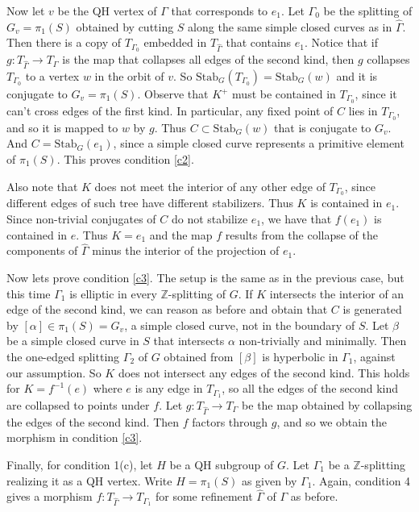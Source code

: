 \documentclass[12pt]{amsart}
\newcommand{\Z}{\mathbb{Z}}
\newcommand{\Stab}{\mbox{Stab}}
\begin{document}
 Now let $v$ be the QH vertex of $\Gamma$ that corresponds to $e_1$. Let $\Gamma_0$ be the splitting of $G_v = \pi_1(S)$ obtained by cutting $S$ along the same simple closed curves as in $\hat \Gamma$. Then there is a copy of $T_{\Gamma_0}$ embedded in $T_{\hat \Gamma}$ that contains $e_1$. Notice that if $g:T_{\hat \Gamma} \to T_{\Gamma}$ is the map that collapses all edges of the second kind, then $g$ collapses $T_{\Gamma_0}$ to a vertex $w$ in the orbit of $v$. So $\Stab_G(T_{\Gamma_0})=\Stab_G(w)$ and it is conjugate to $G_v = \pi_1(S)$. Observe that  $K^+$ must be contained in $T_{\Gamma_0}$, since it can't cross edges of the first kind. In particular, any fixed point of $C$ lies in $T_{\Gamma_0}$, and so it is mapped to $w$ by $g$. Thus $C\subset \Stab_G(w)$ that is conjugate to $ G_v$. And $C=\Stab_G(e_1)$, since a simple closed curve represents a primitive element of $\pi_1(S)$. This proves condition \ref{c2}.

Also note that $K$ does not meet the interior of any other edge of $T_{\Gamma_0}$, since different edges of such tree have different stabilizers. Thus $K$ is contained in $e_1$. Since non-trivial conjugates of $C$ do not stabilize $e_1$, we have that $f(e_1)$ is contained in $e$. Thus $K=e_1$ and the map $f$ results from the collapse of the components of $\hat \Gamma$ minus the interior of the projection of $e_1$. 

Now lets prove condition \ref{c3}. The setup is the same as in the previous case, but this time $\Gamma_1$ is elliptic in every $\Z$-splitting of $G$. If $K$ intersects the interior of an edge of the second kind, we can reason as before and obtain that $C$ is generated by $[\alpha] \in \pi_1(S) = G_v$, a simple closed curve, not in the boundary of $S$. Let $\beta$ be a simple closed curve in $S$ that intersects $\alpha$ non-trivially and minimally. Then the one-edged splitting $\Gamma_2$ of $G$ obtained from $[\beta]$ is hyperbolic in $\Gamma_1$, against our assumption. So $K$ does not intersect any edges of the second kind. This holds for $K=f^{-1}(e)$ where $e$ is any edge in $T_{\Gamma_1}$, so all the edges of the second kind are collapsed to points under $f$. Let $g:T_{\hat \Gamma} \to T_{\Gamma}$ be the map obtained by collapsing the edges of the second kind. Then $f$ factors through $g$, and so we obtain the morphism in condition \ref{c3}.

Finally, for condition 1(c), let $H$ be a QH subgroup of $G$. Let $\Gamma_1$ be a $\Z$-splitting realizing it as a QH vertex. Write $H = \pi_1(S)$ as given by $\Gamma_1$. Again, condition 4 gives a morphism $f:T_{\hat \Gamma} \to T_{\Gamma_1}$ for some refinement $\hat \Gamma$ of $\Gamma$ as before. 
\end{document}
